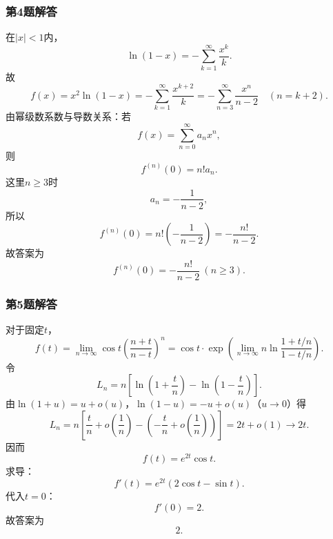 \documentclass[./book.tex]{subfiles}
\begin{document}
    \subsubsection*{第4题解答}
    \begin{analysisbox}
        在$|x|<1$内，
        \[
            \ln(1-x)=-\sum_{k=1}^{\infty}\frac{x^k}{k}.
        \]
        故
        \[
            f(x)=x^2\ln(1-x)
            =-\sum_{k=1}^{\infty}\frac{x^{k+2}}{k}
            =-\sum_{n=3}^{\infty}\frac{x^n}{n-2}\quad(n=k+2).
        \]
        由幂级数系数与导数关系：若
        \[
            f(x)=\sum_{n=0}^{\infty}a_nx^n,
        \]
        则
        \[
            f^{(n)}(0)=n!a_n.
        \]
        这里$n\ge 3$时
        \[
            a_n=-\frac1{n-2},
        \]
        所以
        \[
            f^{(n)}(0)=n!\left(-\frac1{n-2}\right)=-\frac{n!}{n-2}.
        \]
        故答案为
        \[
            \boxed{f^{(n)}(0)=-\frac{n!}{n-2}\ (n\ge 3)}.
        \]
    \end{analysisbox}

    \subsubsection*{第5题解答}
    \begin{analysisbox}
        对于固定$t$，
        \[
            f(t)=\lim_{n\to\infty}\cos t\left(\frac{n+t}{n-t}\right)^n
            =\cos t\cdot\exp\!\left(\lim_{n\to\infty}n\ln\frac{1+t/n}{1-t/n}\right).
        \]
        令
        \[
            L_n=n\left[\ln\!\left(1+\frac tn\right)-\ln\!\left(1-\frac tn\right)\right].
        \]
        由$\ln(1+u)=u+o(u)$，$\ln(1-u)=-u+o(u)$（$u\to0$）得
        \[
            L_n
            =n\left[\frac tn+o\!\left(\frac1n\right)-\left(-\frac tn+o\!\left(\frac1n\right)\right)\right]
            =2t+o(1)\to 2t.
        \]
        因而
        \[
            f(t)=e^{2t}\cos t.
        \]
        求导：
        \[
            f'(t)=e^{2t}(2\cos t-\sin t).
        \]
        代入$t=0$：
        \[
            f'(0)=2.
        \]
        故答案为
        \[
            \boxed{2}.
        \]
    \end{analysisbox}
\end{document}

